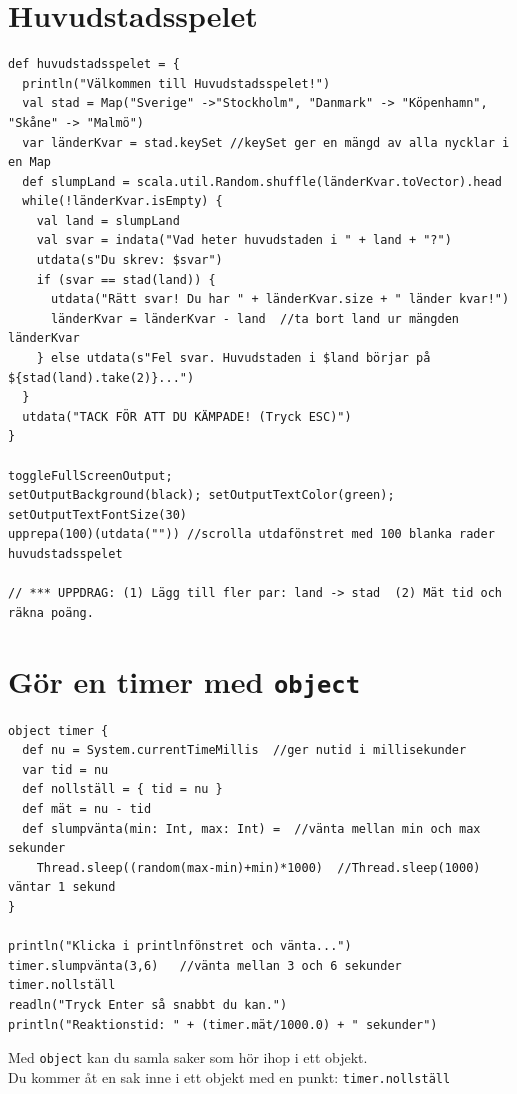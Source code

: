 \chapter{Huvudstadsspelet}
\begin{lstlisting}[basicstyle={\ttfamily\fontsize{13}{16}\selectfont},numbers=none]
def huvudstadsspelet = {
  println("Välkommen till Huvudstadsspelet!")
  val stad = Map("Sverige" ->"Stockholm", "Danmark" -> "Köpenhamn", "Skåne" -> "Malmö")
  var länderKvar = stad.keySet //keySet ger en mängd av alla nycklar i en Map 
  def slumpLand = scala.util.Random.shuffle(länderKvar.toVector).head
  while(!länderKvar.isEmpty) {
    val land = slumpLand
    val svar = indata("Vad heter huvudstaden i " + land + "?")
    utdata(s"Du skrev: $svar")
    if (svar == stad(land)) {
      utdata("Rätt svar! Du har " + länderKvar.size + " länder kvar!")
      länderKvar = länderKvar - land  //ta bort land ur mängden länderKvar
    } else utdata(s"Fel svar. Huvudstaden i $land börjar på ${stad(land).take(2)}...")
  }
  utdata("TACK FÖR ATT DU KÄMPADE! (Tryck ESC)")
}

toggleFullScreenOutput;  
setOutputBackground(black); setOutputTextColor(green); setOutputTextFontSize(30)
upprepa(100)(utdata("")) //scrolla utdafönstret med 100 blanka rader
huvudstadsspelet

// *** UPPDRAG: (1) Lägg till fler par: land -> stad  (2) Mät tid och räkna poäng.
\end{lstlisting}
        
\chapter{Gör en timer med \lstinline{object}}
\begin{lstlisting}[basicstyle={\ttfamily\fontsize{14}{17}\selectfont},numbers=none]
object timer {
  def nu = System.currentTimeMillis  //ger nutid i millisekunder
  var tid = nu
  def nollställ = { tid = nu }
  def mät = nu - tid
  def slumpvänta(min: Int, max: Int) =  //vänta mellan min och max sekunder
    Thread.sleep((random(max-min)+min)*1000)  //Thread.sleep(1000) väntar 1 sekund
}

println("Klicka i printlnfönstret och vänta...")
timer.slumpvänta(3,6)   //vänta mellan 3 och 6 sekunder
timer.nollställ
readln("Tryck Enter så snabbt du kan.")
println("Reaktionstid: " + (timer.mät/1000.0) + " sekunder")
\end{lstlisting}
        
Med \lstinline{object} kan du samla saker som hör ihop i ett objekt.\\
Du kommer åt en sak inne i ett objekt med en punkt: \lstinline{timer.nollställ}
